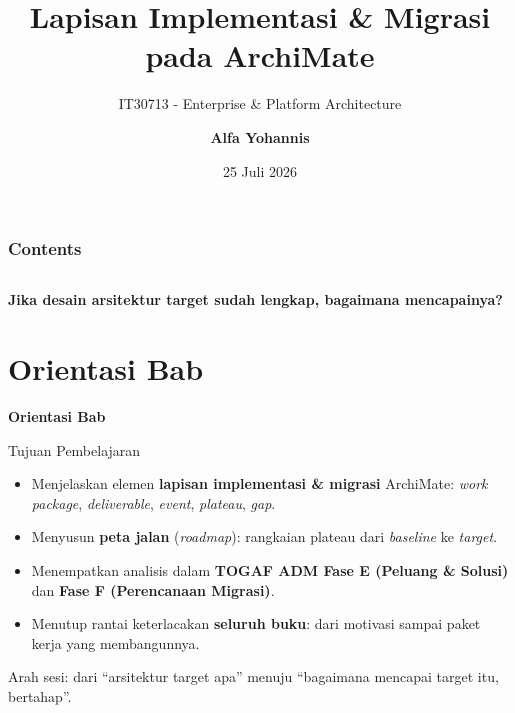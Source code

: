 \documentclass[aspectratio=169, table]{beamer}
\title{\LARGE Lapisan Implementasi \& Migrasi\\
  \vspace{8pt}
  pada ArchiMate}
\subtitle{IT30713 - Enterprise \& Platform Architecture}
\author{\textbf{Alfa Yohannis}}
\date{25 Juli 2026}
\newcommand{\sectionframe}[1]{%
  \begin{frame}{\hfill}
    \centering
    \Huge{\textbf{#1}}
  \end{frame}
}
\newcommand{\takeaway}[1]{%
  \vspace{4pt}
  {\footnotesize #1}
}
\begin{document}
\frame{\titlepage}

\begin{frame}[fragile]
  \frametitle{Contents}
  \vspace{20pt}
  \begin{columns}[t]
    \tableofcontents[sections={1-4}]

    \tableofcontents[sections={5-8}]
  \end{columns}
\end{frame}

\begin{frame}{\hfill}
  \centering
  \Huge{\textbf{Jika desain arsitektur target sudah lengkap, bagaimana mencapainya?}}
\end{frame}

\section{Orientasi Bab}
\sectionframe{Orientasi Bab}

\begin{frame}{Tujuan Pembelajaran}
  \vspace{6pt}
  \begin{itemize}
    \item Menjelaskan elemen \textbf{lapisan implementasi \& migrasi} ArchiMate:
          \emph{work package}, \emph{deliverable}, \emph{event}, \emph{plateau},
          \emph{gap}.
    \item Menyusun \textbf{peta jalan} (\emph{roadmap}): rangkaian plateau dari
          \emph{baseline} ke \emph{target}.
    \item Menempatkan analisis dalam \textbf{TOGAF ADM Fase E (Peluang \& Solusi)}
          dan \textbf{Fase F (Perencanaan Migrasi)}.
    \item Menutup rantai keterlacakan \textbf{seluruh buku}: dari motivasi sampai
          paket kerja yang membangunnya.
  \end{itemize}
  \takeaway{Arah sesi: dari ``arsitektur target apa'' menuju ``bagaimana mencapai
  target itu, bertahap''.}
\end{frame}
\end{document}
